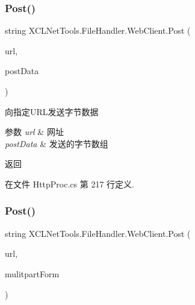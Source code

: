 \subsubsection{\texorpdfstring{Post()}{Post()}\hspace{0.1cm}{\footnotesize\ttfamily [2/3]}}
{\footnotesize\ttfamily string X\+C\+L\+Net\+Tools.\+File\+Handler.\+Web\+Client.\+Post (\begin{DoxyParamCaption}\item[{string}]{url,  }\item[{byte \mbox{[}$\,$\mbox{]}}]{post\+Data }\end{DoxyParamCaption})}



向指定\+U\+R\+L发送字节数据 


\begin{DoxyParams}{参数}
{\em url} & 网址\\
\hline
{\em post\+Data} & 发送的字节数组\\
\hline
\end{DoxyParams}
\begin{DoxyReturn}{返回}

\end{DoxyReturn}


在文件 Http\+Proc.\+cs 第 217 行定义.

\mbox{\label{class_x_c_l_net_tools_1_1_file_handler_1_1_web_client_ab1556a7a601a8425c7d6bcecb09d6cf2}} 
\subsubsection{\texorpdfstring{Post()}{Post()}\hspace{0.1cm}{\footnotesize\ttfamily [3/3]}}
{\footnotesize\ttfamily string X\+C\+L\+Net\+Tools.\+File\+Handler.\+Web\+Client.\+Post (\begin{DoxyParamCaption}\item[{string}]{url,  }\item[{\hyperlink{class_x_c_l_net_tools_1_1_file_handler_1_1_multipart_form}{Multipart\+Form}}]{mulitpart\+Form }\end{DoxyParamCaption})}



